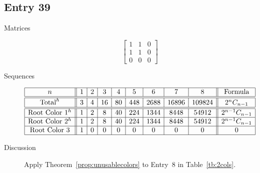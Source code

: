 \documentclass[12pt]{amsart}
\begin{document}
\subsection*{Entry 39}
\begin{description}
    \item[Matrices]
    
    \[\begin{bmatrix}
1 & 1 & 0 \\
1 & 1 & 0 \\
0 & 0 & 0
\end{bmatrix}\]
    \item[Sequences]\hspace*{\fill}\vspace{-0.5cm}
    \begin{center}
        \[
        \begin{array}{|c||c|c|c|c|c|c|c|c||c|}\hline
           n  & 1 & 2 & 3 & 4 & 5 & 6 & 7 & 8  & \text{Formula}\\\hline\hline
           \text{Total}^{h}  & 3 & 4 & 16 & 80 & 448 & 2688 & 16896 & 109824 & 2^{n}C_{n-1}\\\hline\hline
           \text{Root Color }1^h & 1 & 2 & 8 & 40 & 224 & 1344 & 8448 & 54912 & 2^{n-1}C_{n-1}\\\hline
           \text{Root Color }2^h & 1 & 2 & 8 & 40 & 224 & 1344 & 8448 & 54912 & 2^{n-1}C_{n-1}\\\hline
           \text{Root Color }3 & 1 & 0 & 0 & 0 & 0 & 0 & 0 & 0 & 0\\\hline
        \end{array}
        \]
    \end{center}
    


\item[Discussion] Apply Theorem~\ref{prop:unusablecolors} to Entry~8 in Table~\ref{tb:2cols}.
    
\end{description}
\end{document}
